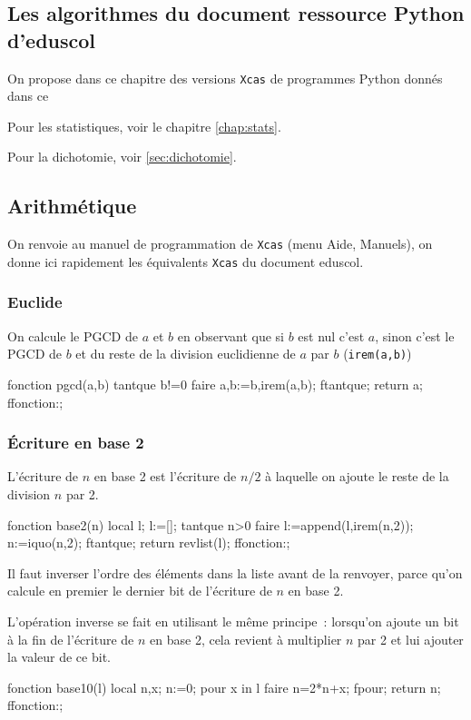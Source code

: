 \documentclass[12pt,a4paper]{book}
\begin{document}
\begin{giacjshere}
\chapter{Les algorithmes du document ressource Python d'eduscol}
On propose dans ce chapitre des versions {\tt Xcas} de programmes
Python donn\'es dans ce

Pour les statistiques, voir le chapitre \ref{chap:stats}. 

Pour la dichotomie, voir \ref{sec:dichotomie}.

\section{Arithm\'etique}
On renvoie au manuel de programmation de {\tt Xcas} (menu Aide, Manuels), on
donne ici rapidement les \'equivalents {\tt Xcas} du document eduscol.

\subsection{Euclide}
On calcule le PGCD de $a$ et $b$ en observant que si $b$ est nul c'est $a$,
sinon c'est le PGCD de $b$ et du reste de la division euclidienne de $a$ par
$b$ (\verb|irem(a,b)|)
\begin{giaconload}
fonction pgcd(a,b)
  tantque b!=0 faire 
    a,b:=b,irem(a,b);
  ftantque;
  return a;
ffonction:;
\end{giaconload}

\subsection{\'Ecriture en base 2}
L'\'ecriture de $n$ en base 2 est l'\'ecriture de $n/2$ \`a laquelle
on ajoute le reste de la division $n$ par 2.
\begin{giaconload}
fonction base2(n)
  local l;
  l:=[];
  tantque n>0 faire
    l:=append(l,irem(n,2));
    n:=iquo(n,2);
  ftantque;
  return revlist(l);
ffonction:;
\end{giaconload}
Il faut inverser l'ordre des \'el\'ements dans la liste 
avant de la renvoyer, parce qu'on calcule
en premier le dernier bit de l'\'ecriture de $n$ en base 2.

L'op\'eration inverse se fait en utilisant le m\^eme principe~: lorsqu'on
ajoute un bit \`a la fin de l'\'ecriture de $n$ en base 2, cela revient
\`a multiplier $n$ par 2 et lui ajouter la valeur de ce bit.
\begin{giaconload}
fonction base10(l)
  local n,x;
  n:=0;
  pour x in l faire
    n=2*n+x;
  fpour;
  return n;
ffonction:;
\end{giaconload}


\end{giacjshere}
\end{document}
